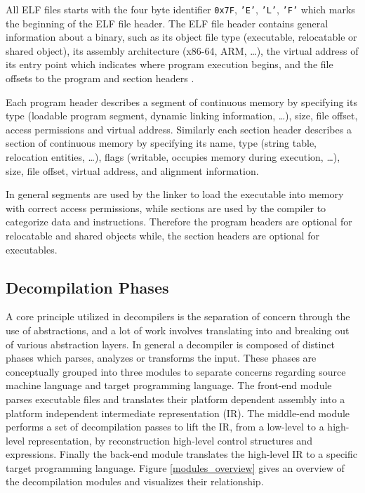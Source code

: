 \documentclass[12pt, a4paper]{article}
\begin{document}
All ELF files starts with the four byte identifier \texttt{0x7F}, \texttt{'E'}, \texttt{'L'}, \texttt{'F'} which marks the beginning of the ELF file header. The ELF file header contains general information about a binary, such as its object file type (executable, relocatable or shared object), its assembly architecture (x86-64, ARM, …), the virtual address of its entry point which indicates where program execution begins, and the file offsets to the program and section headers \cite{elf_dissection}.

Each program header describes a segment of continuous memory by specifying its type (loadable program segment, dynamic linking information, …), size, file offset, access permissions and virtual address. Similarly each section header describes a section of continuous memory by specifying its name, type (string table, relocation entities, …), flags (writable, occupies memory during execution, …), size, file offset, virtual address, and alignment information.

In general segments are used by the linker to load the executable into memory with correct access permissions, while sections are used by the compiler to categorize data and instructions. Therefore the program headers are optional for relocatable and shared objects while, the section headers are optional for executables.


\subsection{Decompilation Phases}

A core principle utilized in decompilers is the separation of concern through the use of abstractions, and a lot of work involves translating into and breaking out of various abstraction layers. In general a decompiler is composed of distinct phases which parses, analyzes or transforms the input. These phases are conceptually grouped into three modules to separate concerns regarding source machine language and target programming language. The front-end module parses executable files and translates their platform dependent assembly into a platform independent intermediate representation (IR). The middle-end module performs a set of decompilation passes to lift the IR, from a low-level to a high-level representation, by reconstruction high-level control structures and expressions. Finally the back-end module translates the high-level IR to a specific target programming language. Figure \ref{modules_overview} gives an overview of the decompilation modules and visualizes their relationship.
\end{document}
